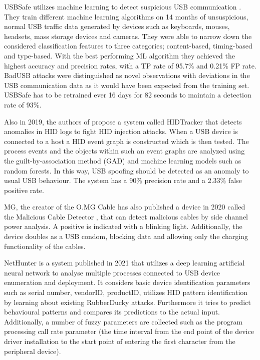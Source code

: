 USBSafe utilizes machine learning to detect suspicious USB communication \cite{kharrazUSBESAFEEndPointSolution2019}. They train different machine learning algorithms on 14 months of unsuspicious, normal USB traffic data generated by devices such as keyboards, mouses, headsets, mass storage devices and cameras. They were able to narrow down the considered classification features to three categories; content-based, timing-based and type-based. With the best performing ML algorithm they achieved the highest accuracy and precision rates, with a TP rate of 95.7\% and 0.21\% FP rate. BadUSB attacks were distinguished as novel observations with deviations in the USB communication data as it would have been expected from the training set. 
USBSafe has to be retrained ever 16 days for 82 seconds to maintain a detection rate of 93\%.

Also in 2019, the authors of \cite{IdentifyingHIDbasedAttacks2019} propose a system called HIDTracker that detects anomalies in HID logs to fight HID injection attacks. When a USB device is connected to a host a HID event graph is constructed which is then tested. The process events and the objects within such an event graphs are analyzed using the guilt-by-association method (GAD) and machine learning models such as random forests. In this way, USB spoofing should be detected as an anomaly to usual USB behaviour. The system has a 90\% precision rate and a 2.33\% false positive rate. 

MG, the creator of the O.MG Cable has also published a device in 2020 called the Malicious Cable Detector \cite{hak5MaliciousCableDetector}, that can detect malicious cables by side channel power analysis. A positive is indicated with a blinking light. Additionally, the device doubles as a USB condom, blocking data and allowing only the charging functionality of the cables. 

NetHunter \cite{IntelligentSystemPreventing} is a system published in 2021 that utilizes a deep learning artificial neural network to analyse multiple processes connected to USB device enumeration and deployment. It considers basic device identification parameters such as serial number, vendorID, productID, utilizes HID pattern identification by learning about existing RubberDucky attacks. Furthermore it tries to predict behavioural patterns and compares its predictions to the actual input. Additionally, a number of fuzzy parameters are collected such as the program processing call rate parameter (the time interval from the end point of the device driver installation to the start point of entering the first character from the peripheral device). 

